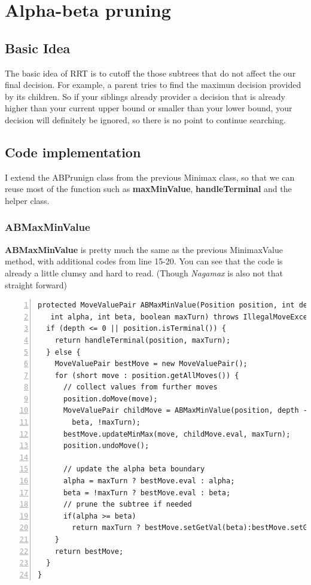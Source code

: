\documentclass{article}
\begin{document}
\clearpage
\section{Alpha-beta pruning}
\subsection{Basic Idea}
The basic idea of RRT is to cutoff the those subtrees that do not affect the our final decision. For example, a parent tries to find the maximun decision provided by its children. So if your siblings already provider a decision that is already higher than your current upper bound or smaller than your lower bound, your decision will definitely be ignored, so there is no point to continue searching.

\subsection{Code implementation}

I extend the ABPrunign class from the previous Minimax class, so that we can reuse most of the function such as \textbf{maxMinValue}, \textbf{handleTerminal} and the helper class.

\subsubsection{ABMaxMinValue}

\textbf{ABMaxMinValue} is pretty much the same as the previous MinimaxValue method, with additional codes from line 15-20. You can see that the code is already a little clumsy and hard to read. (Though \emph{Nagamax} is also not that straight forward)

\begin{lstlisting}[numbers=left]
protected MoveValuePair ABMaxMinValue(Position position, int depth,
   int alpha, int beta, boolean maxTurn) throws IllegalMoveException {
  if (depth <= 0 || position.isTerminal()) {
    return handleTerminal(position, maxTurn);
  } else {
    MoveValuePair bestMove = new MoveValuePair();
    for (short move : position.getAllMoves()) {
      // collect values from further moves
      position.doMove(move);
      MoveValuePair childMove = ABMaxMinValue(position, depth - 1, alpha,
        beta, !maxTurn);
      bestMove.updateMinMax(move, childMove.eval, maxTurn);
      position.undoMove();

      // update the alpha beta boundary
      alpha = maxTurn ? bestMove.eval : alpha;
      beta = !maxTurn ? bestMove.eval : beta;
      // prune the subtree if needed
      if(alpha >= beta)
        return maxTurn ? bestMove.setGetVal(beta):bestMove.setGetVal(alpha);
    }
    return bestMove;
  }
}
\end{lstlisting}
\end{document}
